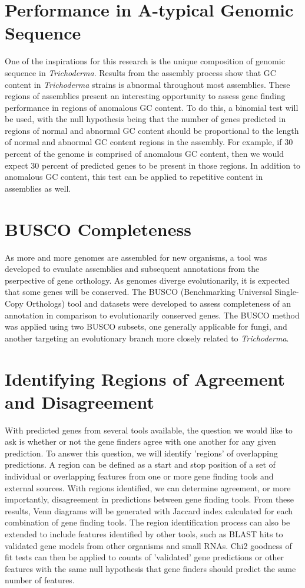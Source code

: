 \section{Performance in A-typical Genomic Sequence}

One of the inspirations for this research is the unique composition of
genomic sequence in \textit{Trichoderma}. Results from the assembly
process show that GC content in \textit{Trichoderma} strains is
abnormal throughout most assemblies. These regions of assemblies
present an interesting opportunity to assess gene finding performance
in regions of anomalous GC content. To do this, a binomial test will
be used, with the null hypothesis being that the number of genes
predicted in regions of normal and abnormal GC content should be
proportional to the length of normal and abnormal GC content regions
in the assembly. For example, if 30 percent of the genome is comprised
of anomalous GC content, then we would expect 30 percent of predicted
genes to be present in those regions. In addition to anomalous GC
content, this test can be applied to repetitive content in assemblies
as well.

\section{BUSCO Completeness}

As more and more genomes are assembled for new organisms, a tool was
developed to evaulate assemblies and subsequent annotations from the
pserpective of gene orthology. As genomes diverge evolutionarily, it
is expected that some genes will be conserved. The BUSCO (Benchmarking
Universal Single-Copy Orthologs) tool and datasets were developed to
assess completeness of an annotation in comparison to evolutionarily
conserved genes. The BUSCO method was applied using two BUSCO subsets,
one generally applicable for fungi, and another targeting an
evolutionary branch more closely related to \textit{Trichoderma}.


\section{Identifying Regions of Agreement and Disagreement}

With predicted genes from several tools available, the question we
would like to ask is whether or not the gene finders agree with one
another for any given prediction. To answer this question, we will
identify 'regions' of overlapping predictions. A region can be defined
as a start and stop position of a set of individual or overlapping
features from one or more gene finding tools and external
sources. With regions identified, we can determine agreement, or more
importantly, disagreement in predictions between gene finding
tools. From these results, Venn diagrams will be generated with
Jaccard index calculated for each combination of gene finding
tools. The region identification process can also be extended to
include features identified by other tools, such as BLAST hits to
validated gene models from other organisms and small RNAs. Chi2
goodness of fit tests can then be applied to counts of 'validated'
gene predictions or other features with the same null hypothesis that
gene finders should predict the same number of features.
